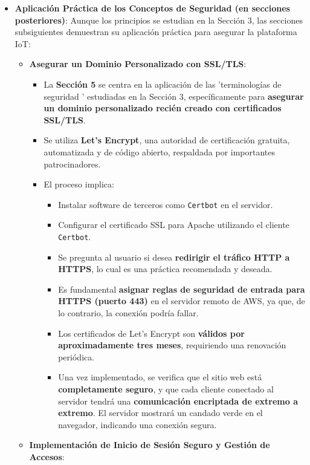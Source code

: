 \documentclass{report}
\begin{document}
\begin{itemize}
    \item \textbf{Aplicación Práctica de los Conceptos de Seguridad (en secciones posteriores)}: Aunque los principios se estudian en la Sección 3, las 
    secciones subsiguientes demuestran su aplicación práctica para asegurar la plataforma IoT:
    \begin{itemize}
        \item \textbf{Asegurar un Dominio Personalizado con SSL/TLS}:
        \begin{itemize}
            \item La \textbf{Sección 5} se centra en la aplicación de las  'terminologías de seguridad ' estudiadas en la Sección 3, específicamente para 
            \textbf{asegurar un dominio personalizado recién creado con certificados SSL/TLS}.
            \item Se utiliza \textbf{Let's Encrypt}, una autoridad de certificación gratuita, automatizada y de código abierto, respaldada por importantes 
            patrocinadores.
            \item El proceso implica:
            \begin{itemize}
                \item Instalar software de terceros como \texttt{Certbot} en el servidor.
                \item Configurar el certificado SSL para Apache utilizando el cliente \texttt{Certbot}.
                \item Se pregunta al usuario si desea \textbf{redirigir el tráfico HTTP a HTTPS}, lo cual es una práctica recomendada y deseada.
                \item Es fundamental \textbf{asignar reglas de seguridad de entrada para HTTPS (puerto 443)} en el servidor remoto de AWS, ya que, de lo 
                contrario, la conexión podría fallar.
                \item Los certificados de Let's Encrypt son \textbf{válidos por aproximadamente tres meses}, requiriendo una renovación periódica.
                \item Una vez implementado, se verifica que el sitio web está \textbf{completamente seguro}, y que cada cliente conectado al servidor 
                tendrá una \textbf{comunicación encriptada de extremo a extremo}. El servidor mostrará un candado verde en el navegador, indicando una 
                conexión segura.
            \end{itemize}
        \end{itemize}
        \item \textbf{Implementación de Inicio de Sesión Seguro y Gestión de Accesos}:

\end{itemize}
\end{itemize}
\end{document}
